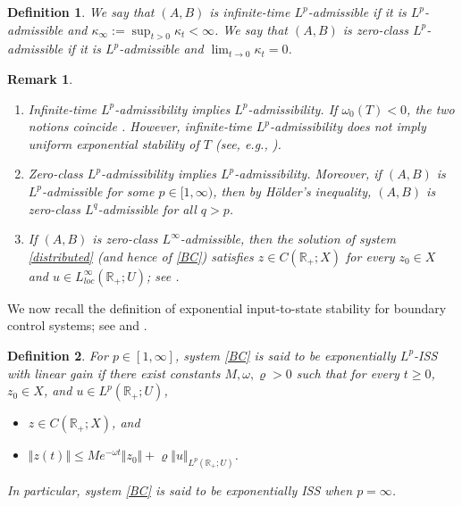 \documentclass[onecolumn]{autart}
\def\R{{\mathbb{R}}}
\def\R{\mathbb R}
\newtheorem{definition}{Definition}[section]
\newtheorem{remark}{Remark}[section]
\numberwithin{equation}{section}
\begin{document}
	\begin{definition}
		We say that $(A,B)$ is \emph{infinite-time $L^p$-admissible} if it is $L^p$-admissible and $\kappa_\infty := \sup_{t > 0} \kappa_t < \infty$. We say that $(A,B)$ is \emph{zero-class $L^p$-admissible} if it is $L^p$-admissible and $\lim_{t \to 0} \kappa_t = 0$.
	\end{definition}
	
	\begin{remark}\label{Remark-zer0-class}
		\begin{enumerate}
			\item[(i)] Infinite-time $L^p$-admissibility implies $L^p$-admissibility. If $\omega_0(T)<0$, the two notions coincide \cite[Lem. 2.9-(i)]{JaNPS}. However, infinite-time $L^p$-admissibility does not imply uniform exponential stability of $T$ (see, e.g., \cite[Exp. 4.2.7]{TW}).
			\item[(ii)] Zero-class $L^p$-admissibility implies $L^p$-admissibility. Moreover, if $(A,B)$ is $L^p$-admissible for some $p \in [1, \infty)$, then by H\"{o}lder's inequality, $(A,B)$ is zero-class $L^q$-admissible for all $q > p$.
			\item[(iii)]  If $(A,B)$ is zero-class $L^\infty$-admissible, then the solution of system \eqref{distributed} (and hence of \eqref{BC}) satisfies $z\in {C}(\R_+;X)$ for every $z_0 \in X$ and $u \in L^{\infty}_{loc}(\R_+;U)$; see  \cite[Prop. 2.5]{JaNPS}.
		\end{enumerate}
	\end{remark}
	
	We now recall the definition of exponential input-to-state stability for boundary control systems; see \cite[Def. 2.7]{JaNPS} and \cite[Def. 3.17]{Andri}.
	\begin{definition}\label{ISS-def}
		For $p \in [1, \infty]$, system \eqref{BC} is said to be \emph{exponentially $L^p$-ISS} with linear gain if there exist constants $M, \omega, \varrho > 0$ such that for every $t \ge 0$, $z_0 \in X$, and $u \in L^p(\R_+; U)$,
		\begin{itemize}
			\item[(i)] $z  \in {C}(\R_+;X)$, and
			\item[(ii)] $\Vert z(t) \Vert \le M e^{-\omega t} \Vert z_0 \Vert + \varrho \Vert u \Vert_{L^p(\R_+; U)}$.
		\end{itemize}
        In particular, system \eqref{BC} is said to be \emph{exponentially ISS} when $p = \infty$.
   	\end{definition}
	
\end{document}
